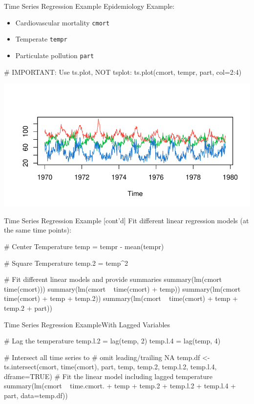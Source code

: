 \documentclass[ignorenonframetext,xcolor=x11names]{beamer}
\begin{document}
\begin{frame}[fragile]{Time Series Regression Example}
Epidemiology Example:
\begin{itemize}
  \item Cardiovascular mortality \texttt{cmort}
  \item Temperate \texttt{tempr}
  \item Particulate pollution \texttt{part}
\end{itemize}

\begin{Rcode}
# IMPORTANT: Use ts.plot, NOT tsplot:
ts.plot(cmort, tempr, part, col=2:4)
\end{Rcode} 

\vspace{-2\baselineskip}
\includegraphics[width=1.05\textwidth]{figure11.pdf}
\end{frame}

\begin{frame}[fragile]{Time Series Regression Example \small [cont'd]}
Fit different linear regression models (at the same time points):
\begin{Rcode}
# Center Temperature
temp = tempr - mean(tempr)

# Square Temperature
temp.2 = temp^2

# Fit different linear models and provide summaries
summary(lm(cmort ~ time(cmort)))
summary(lm(cmort ~ time(cmort) + temp))
summary(lm(cmort ~ time(cmort) + temp + temp.2))
summary(lm(cmort ~ time(cmort) + temp + temp.2 + part))
\end{Rcode}
\end{frame}

\begin{frame}[fragile]{Time Series Regression Example}{With Lagged Variables}

\begin{Rcode}
# Lag the temperature
temp.l.2 = lag(temp, 2)
temp.l.4 = lag(temp, 4)

# Intersect all time series to
# omit leading/trailing NA
temp.df <- ts.intersect(cmort, time(cmort), part, 
                        temp, temp.2, temp.l.2, 
                        temp.l.4,
                        dframe=TRUE)
# Fit the linear model including lagged temperature
summary(lm(cmort ~ time.cmort. + temp + temp.2 + 
                   temp.l.2 + temp.l.4 + part, 
           data=temp.df))
\end{Rcode}
\end{frame}
\end{document}
